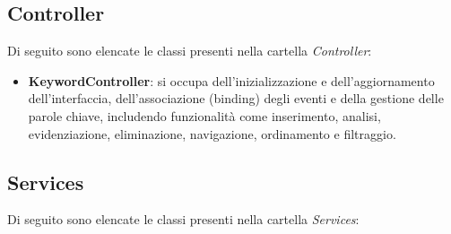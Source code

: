 \subsection{Controller}

\par Di seguito sono elencate le classi presenti nella cartella \textit{Controller}:

\begin{itemize}
  \item \textbf{KeywordController}: si occupa dell’inizializzazione e dell’aggiornamento dell’interfaccia, dell’associazione (binding) degli eventi e della gestione delle parole chiave, includendo funzionalità come inserimento, analisi, evidenziazione, eliminazione, navigazione, ordinamento e filtraggio.
\end{itemize}

\subsection{Services}

\par Di seguito sono elencate le classi presenti nella cartella \textit{Services}:

